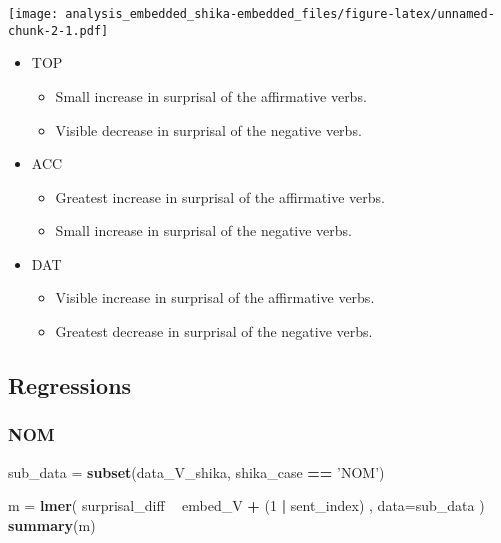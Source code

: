 \documentclass[]{ltjsarticle}
\newenvironment{Shaded}{\begin{snugshade}}{\end{snugshade}}
\newcommand{\KeywordTok}[1]{\textcolor[rgb]{0.13,0.29,0.53}{\textbf{#1}}}
\newcommand{\DataTypeTok}[1]{\textcolor[rgb]{0.13,0.29,0.53}{#1}}
\newcommand{\DecValTok}[1]{\textcolor[rgb]{0.00,0.00,0.81}{#1}}
\newcommand{\StringTok}[1]{\textcolor[rgb]{0.31,0.60,0.02}{#1}}
\newcommand{\OperatorTok}[1]{\textcolor[rgb]{0.81,0.36,0.00}{\textbf{#1}}}
\newcommand{\NormalTok}[1]{#1}
\providecommand{\tightlist}{%
  \setlength{\itemsep}{0pt}\setlength{\parskip}{0pt}}
\begin{document}
\texttt{[image: analysis\_embedded\_shika-embedded\_files/figure-latex/unnamed-chunk-2-1.pdf]}

\begin{itemize}
\tightlist
\item
  TOP

  \begin{itemize}
  \tightlist
  \item
    Small increase in surprisal of the affirmative verbs.
  \item
    Visible decrease in surprisal of the negative verbs.
  \end{itemize}
\item
  ACC

  \begin{itemize}
  \tightlist
  \item
    Greatest increase in surprisal of the affirmative verbs.
  \item
    Small increase in surprisal of the negative verbs.
  \end{itemize}
\item
  DAT

  \begin{itemize}
  \tightlist
  \item
    Visible increase in surprisal of the affirmative verbs.
  \item
    Greatest decrease in surprisal of the negative verbs.
  \end{itemize}
\end{itemize}

\subsection{Regressions}\label{regressions}

\subsubsection{NOM}\label{nom}

\begin{Shaded}
\begin{Highlighting}[]
\NormalTok{sub_data =}\StringTok{ }\KeywordTok{subset}\NormalTok{(data_V_shika, shika_case }\OperatorTok{==}\StringTok{ 'NOM'}\NormalTok{)}

\NormalTok{m =}\StringTok{ }\KeywordTok{lmer}\NormalTok{(}
\NormalTok{        surprisal_diff}
            \OperatorTok{~}\StringTok{ }\NormalTok{embed_V}
                \OperatorTok{+}\StringTok{ }\NormalTok{(}\DecValTok{1} \OperatorTok{|}\StringTok{ }\NormalTok{sent_index)}
\NormalTok{        ,}
        \DataTypeTok{data=}\NormalTok{sub_data}
\NormalTok{        )}
\KeywordTok{summary}\NormalTok{(m)}
\end{Highlighting}
\end{Shaded}
\end{document}
